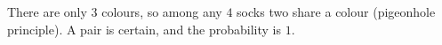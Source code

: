 There are only \(3\) colours, so among any \(4\) socks two share a colour (pigeonhole principle). A pair is certain, and the probability is \(\boxed{1}\).

